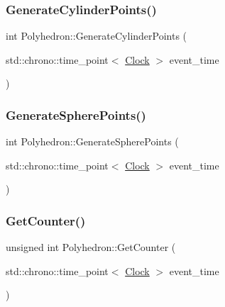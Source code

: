\mbox{\label{classPolyhedron_a642a64ae8cde5e2a9f15334e151fd3f9}} 
\subsubsection{\texorpdfstring{Generate\+Cylinder\+Points()}{GenerateCylinderPoints()}}
{\footnotesize\ttfamily int Polyhedron\+::\+Generate\+Cylinder\+Points (\begin{DoxyParamCaption}\item[{std\+::chrono\+::time\+\_\+point$<$ \mbox{\hyperlink{universe_8h_a0ef8d951d1ca5ab3cfaf7ab4c7a6fd80}{Clock}} $>$}]{event\+\_\+time }\end{DoxyParamCaption})}

\mbox{\label{classPolyhedron_a15d1cae35ceb6c1ba559928fd417800c}} 
\subsubsection{\texorpdfstring{Generate\+Sphere\+Points()}{GenerateSpherePoints()}}
{\footnotesize\ttfamily int Polyhedron\+::\+Generate\+Sphere\+Points (\begin{DoxyParamCaption}\item[{std\+::chrono\+::time\+\_\+point$<$ \mbox{\hyperlink{universe_8h_a0ef8d951d1ca5ab3cfaf7ab4c7a6fd80}{Clock}} $>$}]{event\+\_\+time }\end{DoxyParamCaption})}

\mbox{\label{classPolyhedron_a021ec67f2040f8ec26df64e4b9370521}} 
\subsubsection{\texorpdfstring{Get\+Counter()}{GetCounter()}}
{\footnotesize\ttfamily unsigned int Polyhedron\+::\+Get\+Counter (\begin{DoxyParamCaption}\item[{std\+::chrono\+::time\+\_\+point$<$ \mbox{\hyperlink{universe_8h_a0ef8d951d1ca5ab3cfaf7ab4c7a6fd80}{Clock}} $>$}]{event\+\_\+time }\end{DoxyParamCaption})\hspace{0.3cm}{\ttfamily [inline]}}

